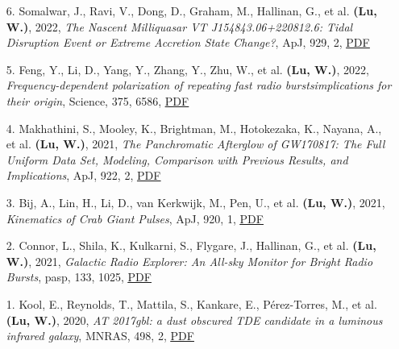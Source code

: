 \begin{itemize}[leftmargin=0.65cm]
\vspace{-0.1cm}
\item[6.]{Somalwar, J., Ravi, V., Dong, D., Graham, M., Hallinan, G., et al. {\bf (Lu, W.)}, 2022, {\it The Nascent Milliquasar VT J154843.06+220812.6: Tidal Disruption Event or Extreme Accretion State Change?}, ApJ, 929, 2, \href{https://ui.adsabs.harvard.edu/abs/2022ApJ...929..184S}{\underline{PDF}}}

\vspace{-0.1cm}
\item[5.]{Feng, Y., Li, D., Yang, Y., Zhang, Y., Zhu, W., et al. {\bf (Lu, W.)}, 2022, {\it Frequency-dependent polarization of repeating fast radio bursts{\textemdash}implications for their origin}, Science, 375, 6586, \href{https://ui.adsabs.harvard.edu/abs/2022Sci...375.1266F}{\underline{PDF}}}

\vspace{-0.1cm}
\item[4.]{Makhathini, S., Mooley, K., Brightman, M., Hotokezaka, K., Nayana, A., et al. {\bf (Lu, W.)}, 2021, {\it The Panchromatic Afterglow of GW170817: The Full Uniform Data Set, Modeling, Comparison with Previous Results, and Implications}, ApJ, 922, 2, \href{https://ui.adsabs.harvard.edu/abs/2021ApJ...922..154M}{\underline{PDF}}}

\vspace{-0.1cm}
\item[3.]{Bij, A., Lin, H., Li, D., van Kerkwijk, M., Pen, U., et al. {\bf (Lu, W.)}, 2021, {\it Kinematics of Crab Giant Pulses}, ApJ, 920, 1, \href{https://ui.adsabs.harvard.edu/abs/2021ApJ...920...38B}{\underline{PDF}}}

\vspace{-0.1cm}
\item[2.]{Connor, L., Shila, K., Kulkarni, S., Flygare, J., Hallinan, G., et al. {\bf (Lu, W.)}, 2021, {\it Galactic Radio Explorer: An All-sky Monitor for Bright Radio Bursts}, pasp, 133, 1025, \href{https://ui.adsabs.harvard.edu/abs/2021PASP..133g5001C}{\underline{PDF}}}

\vspace{-0.1cm}
\item[1.]{Kool, E., Reynolds, T., Mattila, S., Kankare, E., P{\'e}rez-Torres, M., et al. {\bf (Lu, W.)}, 2020, {\it AT 2017gbl: a dust obscured TDE candidate in a luminous infrared galaxy}, MNRAS, 498, 2, \href{https://ui.adsabs.harvard.edu/abs/2020MNRAS.498.2167K}{\underline{PDF}}}
\end{itemize}